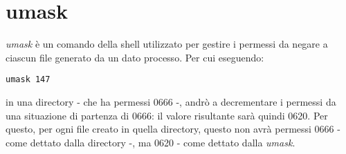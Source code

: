 \section{umask}
\textit{umask} è un comando della shell utilizzato per gestire i permessi da negare a ciascun file generato da un dato processo. Per cui eseguendo:
\begin{lstlisting}
umask 147
\end{lstlisting}
in una directory - che ha permessi 0666 -, andrò a decrementare i permessi da una situazione di partenza di 0666: il valore risultante sarà quindi 0620. Per questo, per ogni file creato in quella directory, questo non avrà permessi 0666 - come dettato dalla directory -, ma 0620 - come dettato dalla \textit{umask}.
